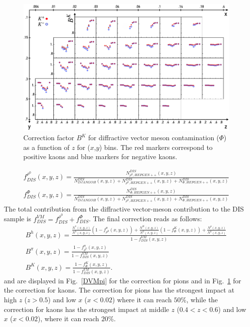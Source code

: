 \begin{figure}
  \centering
	\includegraphics[scale=0.8]{./gfx/DVMK.png}
	\caption{Correction factor $B^{K}$ for diffractive vector meson contamination ($\Phi$) as a function of $z$ for ($x$,$y$) bins. The red markers correspond to positive kaons and blue markers for negative kaons.}
	\label{DVMK}
\end{figure}
%
\begin{equation}\label{eq:DVMDIS}
  \begin{split}
    f^{\rho^0}_{DIS}(x,y,z) = \frac{N^{DIS}_{\rho^0,HEPGEN++}(x,y,z)}{N^{DIS}_{DJANGOH}(x,y,z)+N^{DIS}_{\rho^0,HEPGEN++}(x,y,z)+N^{DIS}_{\Phi,HEPGEN++}(x,y,z)} \\
    f^{\Phi}_{DIS}(x,y,z) = \frac{N^{DIS}_{\Phi,HEPGEN++}(x,y,z)}{N^{DIS}_{DJANGOH}(x,y,z)+N^{DIS}_{\rho^0,HEPGEN++}(x,y,z)+N^{DIS}_{\Phi,HEPGEN++}(x,y,z)}
  \end{split}
\end{equation}
%
The total contribution from the diffractive vector-meson contribution to the DIS sample is $f^{VM}_{DIS} = f^{\rho^0}_{DIS} + f^{\Phi}_{DIS}$. The final correction reads as follows:
%
\begin{equation}
  \begin{split}
  B^h(x,y,z) = \frac{ \frac{N^{\pi}(x,y,z)}{N^h(x,y,z)}\left (1-f^{\pi}_{\rho^0}(x,y,z)\right )
                   + \frac{N^K(x,y,z)}{N^h(x,y,z)}\left (1-f^{K}_{\Phi}(x,y,z)\right ) + \frac{N^p(x,y,z)}{N^h(x,y,z)} }{1-f^{VM}_{DIS}(x,y,z)} \\
  B^{\pi}(x,y,z) = \frac{1-f^{\pi}_{\rho^0}(x,y,z)}{1-f^{VM}_{DIS}(x,y,z)} \\
  B^K(x,y,z) = \frac{1-f^{K}_{\Phi}(x,y,z)}{1-f^{VM}_{DIS}(x,y,z)}.
  \end{split}
\end{equation}
%
and are displayed in Fig.~\ref{DVMpi} for the correction for pions and in Fig.~\ref{DVMK} for the correction for kaons. The correction for pions has the strongest impact at high $z$ ($z>0.5$) and low $x$ ($x<0.02$) where it can reach $50$\%, while the correction for kaons has the strongest impact at middle $z$ ($0.4<z<0.6$) and low $x$ ($x<0.02$), where it can reach $20$\%.

